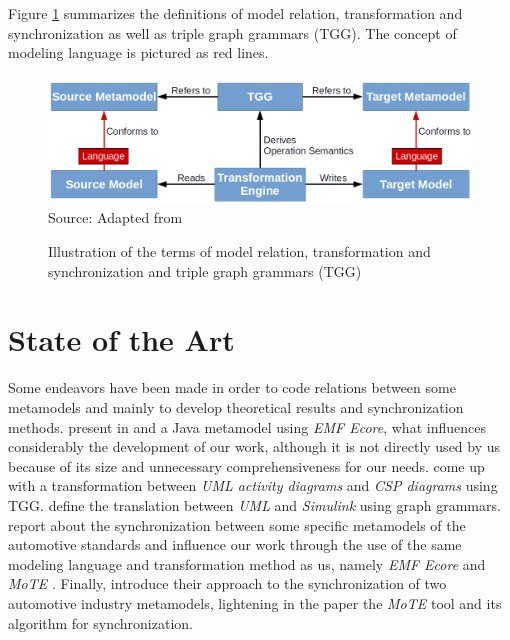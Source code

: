 \documentclass[tuberlin,cic,tc,english,noabntcite,oneside]{iiufrgs}
\begin{document}
	Figure \ref{fig:transformation_scheme} summarizes the definitions of model relation, transformation and synchronization as well as triple graph grammars (TGG). The concept of modeling language is pictured as red lines.
	\begin{figure}[H]
		\centering
	    \caption{Illustration of the terms of model relation, transformation and synchronization and triple graph grammars (TGG)}
	    \includegraphics[width=.7\textwidth]{transformation_scheme} \\
	    Source: Adapted from \citet[p. 623]{czarnecki2006feature}
	    \label{fig:transformation_scheme}
	\end{figure}

\chapter{State of the Art}
Some endeavors have been made in order to code relations between some metamodels and mainly to develop theoretical results and synchronization methods. \citeauthor{heidenreich2010closing} present in \citeyearpar{heidenreich2009jamopp} and \citeyearpar{heidenreich2010closing} a Java metamodel using \emph{EMF Ecore}, what influences considerably the development of our work, although it is not directly used by us because of its size and unnecessary comprehensiveness for our needs. \citet{greenyer2008tggs} come up with a transformation between \emph{UML activity diagrams} and \emph{CSP diagrams} using TGG. \citet{foss2011uml} define the translation between \emph{UML} and \emph{Simulink} using graph grammars. \citet{blouin2014synchronization} report about the synchronization between some specific metamodels of the automotive standards and influence our work through the use of the same modeling language and transformation method as us, namely \emph{EMF Ecore} \citep{steinberg2008emf} and \emph{MoTE} \citep{giese2010toward}. Finally, \citet{giese2010model} introduce their approach to the synchronization of two automotive industry metamodels, lightening in the paper the \emph{MoTE} tool and its algorithm for synchronization.
\end{document}
